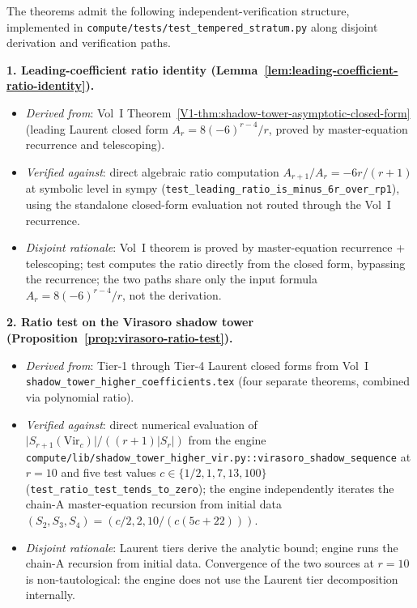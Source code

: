 The theorems admit the following independent-verification structure,
implemented in
\texttt{compute/tests/test\_tempered\_stratum.py} along disjoint
derivation and verification paths.

\textbf{1. Leading-coefficient ratio identity
(Lemma~\ref{lem:leading-coefficient-ratio-identity}).}
\begin{itemize}[nosep]
\item \emph{Derived from}: Vol~I
 Theorem~\ref{V1-thm:shadow-tower-asymptotic-closed-form} (leading Laurent
 closed form $A_r = 8 (-6)^{r-4}/r$, proved by master-equation
 recurrence and telescoping).
\item \emph{Verified against}: direct algebraic ratio computation
 $A_{r+1} / A_r = -6 r / (r+1)$ at symbolic level in sympy
 (\texttt{test\_leading\_ratio\_is\_minus\_6r\_over\_rp1}), using the
 standalone closed-form evaluation not routed through the Vol~I
 recurrence.
\item \emph{Disjoint rationale}: Vol~I theorem is proved by
 master-equation recurrence + telescoping; test computes the ratio
 directly from the closed form, bypassing the recurrence; the two
 paths share only the input formula $A_r = 8 (-6)^{r-4}/r$, not the
 derivation.
\end{itemize}

\textbf{2. Ratio test on the Virasoro shadow tower
(Proposition~\ref{prop:virasoro-ratio-test}).}
\begin{itemize}[nosep]
\item \emph{Derived from}: Tier-1 through Tier-4 Laurent closed forms
 from Vol~I \texttt{shadow\_tower\_higher\_coefficients.tex} (four
 separate theorems, combined via polynomial ratio).
\item \emph{Verified against}: direct numerical evaluation of
 $\lvert S_{r+1}(\mathrm{Vir}_c) \rvert / ((r+1) \lvert S_r \rvert)$
 from the engine
 \texttt{compute/lib/shadow\_tower\_higher\_vir.py::virasoro\_shadow\_sequence}
 at $r = 10$ and five test values $c \in \{1/2, 1, 7, 13, 100\}$
 (\texttt{test\_ratio\_test\_tends\_to\_zero}); the engine
 independently iterates the chain-A master-equation recursion from
 initial data $(S_2, S_3, S_4) = (c/2, 2, 10/(c(5c+22)))$.
\item \emph{Disjoint rationale}: Laurent tiers derive the analytic
 bound; engine runs the chain-A recursion from initial data.
 Convergence of the two sources at $r = 10$ is non-tautological: the
 engine does not use the Laurent tier decomposition internally.
\end{itemize}

